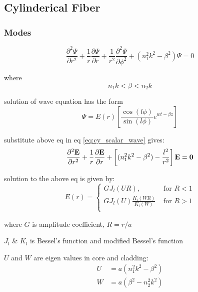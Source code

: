 \documentclass[12pt, onecolumn]{article}
\begin{document}
    \subsection{Cylinderical Fiber}
        \subsubsection{Modes}
            \begin{equation}
                \frac{\partial^2 \Psi}{\partial r^2} 
                + \frac{1}{r} \frac{\partial \Psi}{\partial r} 
                + \frac{1}{r^2} \frac{\partial^2 \Psi}{\partial \phi^2} 
                + (n_1^2 k^2 - \beta^2)\Psi = 0 
                \label{eq:cy_scalar_wave}
            \end{equation}

            where
            \[
                n_1 k < \beta < n_2 k
            \]

            solution of wave equation has the form
            \begin{equation}
                \Psi = E(r) \left[ \frac{\cos(l\phi)}{\sin(l\phi)} e^{wt-\beta z} \right]
            \end{equation}
            
            substitute above eq in eq \ref{eq:cy_scalar_wave} gives:
            \begin{equation}
                \frac{\partial^2 \bf{E}}{\partial r^2} 
                + \frac{1}{r} \frac{\partial \bf{E}}{\partial r} 
                + \left[(n_1^2 k^2 - \beta^2) - \frac{l^2}{r^2} \right]\bf{E} = 0
            \end{equation}

            solution to the above eq is given by:
            \begin{equation}
                E(r) =
                \begin{cases}
                    GJ_l(UR), &\text{ for } R < 1 \\
                    GJ_l(U) \displaystyle\frac{K_i(WR)}{K_i(W)} &\text{ for } R>1\\ 
                \end{cases}
                \label{eq:e_field}
            \end{equation}
            
            where $G$ is amplitude coefficient, $ R = r/a $

            $J_l$ \& $K_l$ is Bessel's function and modified Bessel's function

           $U$ and $W$ are eigen values in core and cladding:
            \begin{equation}
                \begin{aligned}
                    U &= a(n_1^2k^2 - \beta^2) \\
                    W &= a(\beta^2 - n_2^2k^2) \\
                \end{aligned}
                \label{eq:eigen_val}
            \end{equation}
\end{document}
